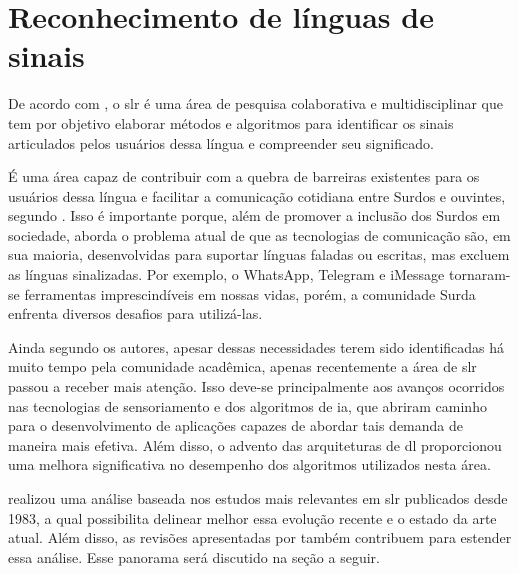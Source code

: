 \section{Reconhecimento de línguas de sinais}
\label{sec:slr}

De acordo com , o \acrfull{slr} é uma área de pesquisa colaborativa e multidisciplinar que tem por objetivo elaborar métodos e algoritmos para identificar os sinais articulados pelos usuários dessa língua e compreender seu significado.

É uma área capaz de contribuir com a quebra de barreiras existentes para os usuários dessa língua e facilitar a comunicação cotidiana entre Surdos e ouvintes, segundo .
Isso é importante porque, além de promover a inclusão dos Surdos em sociedade, aborda o problema atual de que as tecnologias de comunicação são, em sua maioria, desenvolvidas para suportar línguas faladas ou escritas, mas excluem as línguas sinalizadas. Por exemplo, o WhatsApp, Telegram e iMessage tornaram-se ferramentas imprescindíveis em nossas vidas, porém, a comunidade Surda enfrenta diversos desafios para utilizá-las.

Ainda segundo os autores, apesar dessas necessidades terem sido identificadas há muito tempo pela comunidade acadêmica, apenas recentemente a área de \acrshort{slr} passou a receber mais atenção.
Isso deve-se principalmente aos avanços ocorridos nas tecnologias de sensoriamento e dos algoritmos de \acrshort{ia}, que abriram caminho para o desenvolvimento de aplicações capazes de abordar tais demanda de maneira mais efetiva. 
Além disso, o advento das arquiteturas de \acrshort{dl} proporcionou uma melhora significativa no desempenho dos algoritmos utilizados nesta área.

 realizou uma análise baseada nos estudos mais relevantes em \acrshort{slr} publicados desde 1983, a qual possibilita delinear melhor essa evolução recente e o estado da arte atual.
Além disso, as revisões apresentadas por  também contribuem para estender essa análise. Esse panorama será discutido na seção a seguir.

